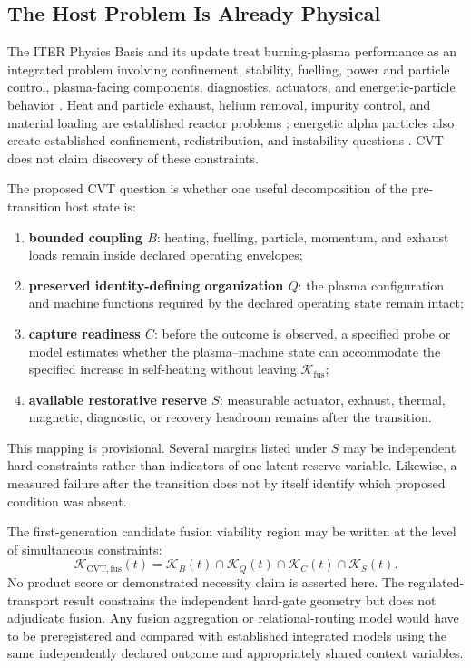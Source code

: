 \documentclass[11pt]{article}
\begin{document}
\subsection{The Host Problem Is Already Physical}

The ITER Physics Basis and its update treat burning-plasma performance as an integrated problem involving confinement, stability, fuelling, power and particle control, plasma-facing components, diagnostics, actuators, and energetic-particle behavior \cite{iter1999,shimada2007}. Heat and particle exhaust, helium removal, impurity control, and material loading are established reactor problems \cite{loarte2007}; energetic alpha particles also create established confinement, redistribution, and instability questions \cite{fasoli2007}. CVT does not claim discovery of these constraints.

The proposed CVT question is whether one useful decomposition of the pre-transition host state is:
\begin{enumerate}[label=(\roman*)]
    \item \textbf{bounded coupling \(B\)}: heating, fuelling, particle, momentum, and exhaust loads remain inside declared operating envelopes;
    \item \textbf{preserved identity-defining organization \(Q\)}: the plasma configuration and machine functions required by the declared operating state remain intact;
    \item \textbf{capture readiness \(C\)}: before the outcome is observed, a specified probe or model estimates whether the plasma--machine state can accommodate the specified increase in self-heating without leaving \(\mathcal K_{\mathrm{fus}}\);
    \item \textbf{available restorative reserve \(S\)}: measurable actuator, exhaust, thermal, magnetic, diagnostic, or recovery headroom remains after the transition.
\end{enumerate}
This mapping is provisional. Several margins listed under \(S\) may be independent hard constraints rather than indicators of one latent reserve variable. Likewise, a measured failure after the transition does not by itself identify which proposed condition was absent.

The first-generation candidate fusion viability region may be written at the level of simultaneous constraints:
\begin{equation}
    \mathcal K_{\mathrm{CVT,fus}}(t)
    =
    \mathcal K_B(t)
    \cap
    \mathcal K_Q(t)
    \cap
    \mathcal K_C(t)
    \cap
    \mathcal K_S(t).
    \label{eq:fusion-cvt-region}
\end{equation}
No product score or demonstrated necessity claim is asserted here. The regulated-transport result constrains the independent hard-gate geometry but does not adjudicate fusion. Any fusion aggregation or relational-routing model would have to be preregistered and compared with established integrated models using the same independently declared outcome and appropriately shared context variables.
\end{document}
